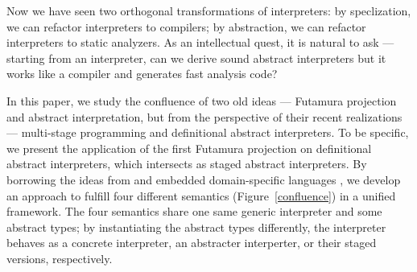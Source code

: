 Now we have seen two orthogonal transformations of interpreters: by
speclization, we can refactor interpreters to compilers; by abstraction, we can
refactor interpreters to static analyzers. As an intellectual quest, it is
natural to ask --- starting from an interpreter, can we derive sound abstract
interpreters but it works like a compiler and generates fast analysis code?

In this paper, we study the confluence of two old ideas --- Futamura projection
and abstract interpretation, but from the perspective of their recent
realizations --- multi-stage programming and definitional abstract interpreters.
To be specific, we present the application of the first Futamura projection on
definitional abstract interpreters, which intersects as staged abstract
interpreters. By borrowing the ideas from 
\cite{DBLP:conf/popl/LiangHJ95, DBLP:journals/pacmpl/DaraisLNH17,
Sergey:2013:MAI:2491956.2491979} and embedded domain-specific languages
\cite{DBLP:conf/snapl/RompfBLSJAOSKDK15, DBLP:journals/jfp/CaretteKS09,
DBLP:conf/icfp/GibbonsW14}, we develop an approach to fulfill four different
semantics (Figure~\ref{confluence}) in a unified framework. The four semantics
share one same generic interpreter and some abstract types; by instantiating the
abstract types differently, the interpreter behaves as a concrete interpreter,
an abstracter interperter, or their staged versions, respectively.


